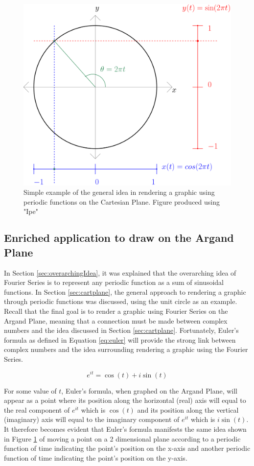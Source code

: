 \documentclass[letterpaper, 12pt]{article}
\begin{document}
\begin{figure}[H]
    \centering
    \includegraphics[width=.6\textwidth]{unitCircle.png}
    \caption{Simple example of the general idea in rendering a graphic using periodic functions on the Cartesian Plane. Figure produced using "Ipe" \protect\cite{IpeExtensibleDrawing}}
    \label{fig:unitCircle}
\end{figure}

\subsection{Enriched application to draw on the Argand Plane} \label{sec:big_guy}

In Section \ref*{sec:overarchingIdea}, it was explained that the overarching idea
of Fourier Series is to represent any periodic function as a sum of
sinusoidal functions. In Section \ref*{sec:cartplane}, the general
approach to rendering a graphic through periodic functions was discussed,
using the unit circle as an example. Recall that the final goal
is to render a graphic using Fourier Series on the Argand Plane,
meaning that a connection must be made between complex numbers and
the idea discussed in Section \ref*{sec:cartplane}. Fortunately,
Euler's formula as defined in Equation \ref*{eq:euler} will provide the strong link between
complex numbers and the idea surrounding rendering a graphic
using the Fourier Series.

\begin{equation}
    e^{it} = \cos(t) + i\sin(t)
    \label{eq:euler}
\end{equation}

For some value of \(t\), Euler's formula, when graphed on the Argand Plane,
will appear as a point where its position along the horizontal (real) axis
will equal to the real component of \(e^{it}\) which is \(\cos (t)\) and its
position along the vertical (imaginary) axis will equal to the imaginary
component of \(e^{it}\) which is \(i \sin (t)\). It therefore becomes
evident that Euler's formula manifests the same idea shown in Figure \ref*{fig:unitCircle} of moving
a point on a 2 dimensional plane according to a periodic function of time
indicating the point's position on the x-axis and another periodic
function of time indicating the point's position on the y-axis.
\end{document}
